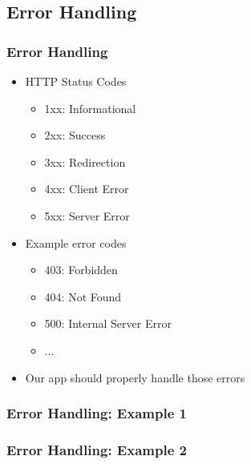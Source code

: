 \documentclass{beamer}
\begin{document}
\subsection{Error Handling} 
\begin{frame}\frametitle{Error Handling}
 
  \begin{itemize}

    \item HTTP Status Codes
    \begin{itemize}
      \item 1xx: Informational
      \item 2xx: Success
      \item 3xx: Redirection
      \item 4xx: Client Error
      \item 5xx: Server Error
    \end{itemize}
  
    \item Example error codes
    \begin{itemize}
      \item 403: Forbidden
      \item 404: Not Found
      \item 500: Internal Server Error
      \item ...
    \end{itemize}

    \item Our app should properly handle those errors
    
  \end{itemize}

\end{frame}



\begin{frame}\frametitle{Error Handling: Example 1}
 
    
 
\end{frame}





\begin{frame}\frametitle{Error Handling: Example 2}
 
    
 
\end{frame}
\end{document}
